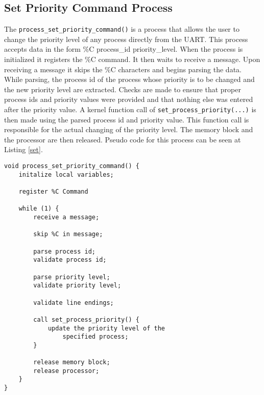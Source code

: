 \documentclass[oneside]{article}
\begin{document}
\subsection*{Set Priority Command Process} 

The \texttt{process\_set\_priority\_command()} is a process that allows the
user to change the priority level of any process directly from the UART. This
process accepts data in the form \%C process\_id priority\_level. When the
process is initialized it registers the \%C command. It then waits to receive a
message.  Upon receiving a message it skips the \%C characters and begins
parsing the data. While parsing, the process id of the process  whose priority
is to be changed and the new priority level are extracted. Checks are made to
ensure that proper process ids and priority values were provided and that
nothing else was entered after the priority value. A kernel function call of
\texttt{set\_process\_priority(...)} is then made using the parsed process id
and priority value. This function call is responsible for the actual changing
of the priority level. The memory block and the processor are then released.
Pseudo code for this process can be seen at Listing \ref{set}.


\begin{lstlisting}
void process_set_priority_command() {
    initalize local variables;
    
    register %C Command

    while (1) {
        receive a message;

        skip %C in message;

        parse process id;
        validate process id;

        parse priority level;
        validate priority level;

        validate line endings;

        call set_process_priority() {
            update the priority level of the
                specified process;
        }

        release memory block;
        release processor;
    }
}
\end{lstlisting}
\end{document}
